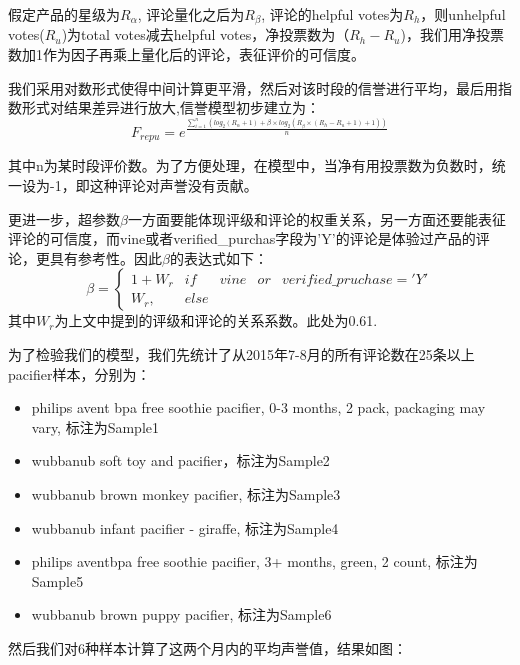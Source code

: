 \documentclass{mcmthesis}
\begin{document}
假定产品的星级为$R_{\alpha}$, 评论量化之后为$R_{\beta}$, 评论的helpful votes为$R_{h}$，则unhelpful votes($R_{u}$)为total votes减去helpful votes，净投票数为（$R_{h}-R_{u}$)，我们用净投票数加1作为因子再乘上量化后的评论，表征评价的可信度。

我们采用对数形式使得中间计算更平滑，然后对该时段的信誉进行平均，最后用指数形式对结果差异进行放大,信誉模型初步建立为：
\begin{equation}
	F_{repu} =  e^{\frac{\sum_{i=1}^{n}(log_2(R_{\alpha}+1)+ \beta \times log_2(R_{\beta}\times(R_{h}-R_{u}+1)+1))}{n}}
	\label{priA}
\end{equation}

其中n为某时段评价数。为了方便处理，在模型中，当净有用投票数为负数时，统一设为-1，即这种评论对声誉没有贡献。

更进一步，超参数$\beta$一方面要能体现评级和评论的权重关系，另一方面还要能表征评论的可信度，而vine或者verified\_purchas字段为'Y'的评论是体验过产品的评论，更具有参考性。因此$\beta$的表达式如下：
\begin{equation}
	\beta =\left\{\begin{matrix}
1+W_{r} & if &vine &or &verified\_pruchase = 'Y'\\ 
W_{r},& else
\end{matrix}\right.
\label{hyperbeta}
\end{equation}
其中$W_{r}$为上文中提到的评级和评论的关系系数。此处为0.61.

为了检验我们的模型，我们先统计了从2015年7-8月的所有评论数在25条以上pacifier样本，分别为：
\begin{itemize}
	\item philips avent bpa free soothie pacifier, 0-3 months, 2 pack, packaging may vary, 标注为Sample1
	\item wubbanub soft toy and pacifier，标注为Sample2
	\item wubbanub brown monkey pacifier, 标注为Sample3
	\item wubbanub infant pacifier - giraffe, 标注为Sample4
	\item philips aventbpa free soothie pacifier, 3+ months, green, 2 count, 标注为Sample5
	\item wubbanub brown puppy pacifier, 标注为Sample6
\end{itemize}
然后我们对6种样本计算了这两个月内的平均声誉值，结果如图：
\end{document}
